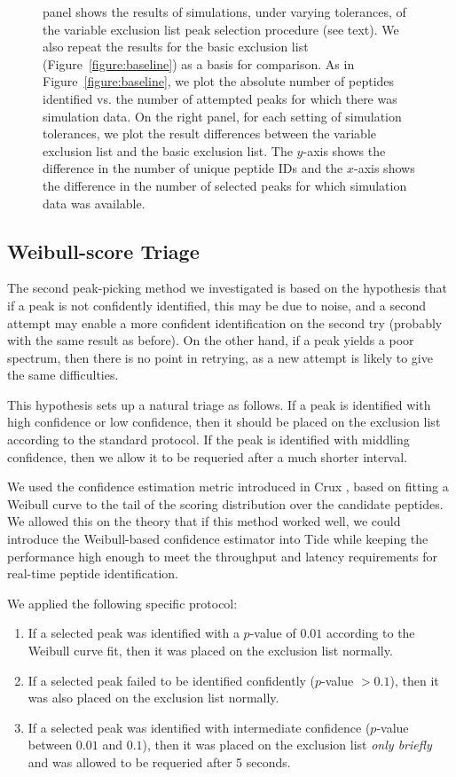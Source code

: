 \documentclass[12pt,twoside,openright]{report}
\begin{document}
\begin{figure}
{  panel shows the results of simulations, under varying tolerances, of the
  variable exclusion list peak selection procedure (see text). We also repeat
  the results for the basic exclusion list (Figure~\ref{figure:baseline}) as a
  basis for comparison. As in Figure~\ref{figure:baseline}, we plot the absolute
  number of peptides identified vs. the number of attempted peaks for which
  there was simulation data. On the right panel, for each setting of simulation
  tolerances, we plot the result differences between the variable exclusion list
  and the basic exclusion list. The $y$-axis shows the difference in the number
  of unique peptide IDs and the $x$-axis shows the difference in the number of
  selected peaks for which simulation data was available.
  \label{figure:variable}}
\end{figure}

\subsection{Weibull-score Triage}

The second peak-picking method we investigated is based on the hypothesis that
if a peak is not confidently identified, this may be due to noise, and a second
attempt may enable a more confident identification on the second try (probably
with the same result as before). On the other hand, if a peak yields a poor
spectrum, then there is no point in retrying, as a new attempt is likely to give
the same difficulties.

This hypothesis sets up a natural triage as follows. If a peak is identified
with high confidence or low confidence, then it should be placed on the
exclusion list according to the standard protocol. If the peak is identified
with middling confidence, then we allow it to be requeried after a much shorter
interval.

We used the confidence estimation metric introduced in Crux \cite{park:rapid},
based on fitting a Weibull curve to the tail of the scoring distribution over
the candidate peptides. We allowed this on the theory that if this method worked
well, we could introduce the Weibull-based confidence estimator into Tide while
keeping the performance high enough to meet the throughput and latency
requirements for real-time peptide identification.

We applied the following specific protocol:
\begin{enumerate}
\item If a selected peak was identified with a $p$-value of $0.01$
according to the Weibull curve fit, then it was placed on the exclusion list
normally.
\item If a selected peak failed to be identified confidently ($p$-value $>0.1$),
  then it was also placed on the exclusion list normally.
\item If a selected peak was identified with intermediate confidence ($p$-value
  between $0.01$ and $0.1$), then it was placed on the exclusion list {\em only
    briefly} and was allowed to be requeried after 5 seconds.
\end{enumerate}
\end{document}
